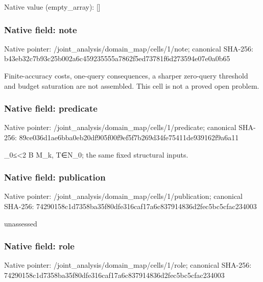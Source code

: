 \documentclass[10pt,a4paper]{article}
\begin{document}
Native value (empty\_\allowbreak{}array): []

\subsubsection{Native field: note}
Native pointer: /joint\_\allowbreak{}analysis/domain\_\allowbreak{}map/cells/1/note; canonical SHA-256: b43eb32c7b93c25b002a6c459235555a7862f5ed73781f6d273594e07e0a0b65

\begingroup\raggedright\sloppy Finite-accuracy costs,\allowbreak{} one-query consequences,\allowbreak{} a sharper zero-query threshold and budget saturation are not assembled. This cell is not a proved open problem.\par\endgroup

\subsubsection{Native field: predicate}
Native pointer: /joint\_\allowbreak{}analysis/domain\_\allowbreak{}map/cells/1/predicate; canonical SHA-256: 89ce036d1ae6bba0eb20df905f00f9ef5f7b269d34fe75411de939162f9a6a11

\begingroup\raggedright{}\allowbreak{}\_\allowbreak{}0{\AtlasUnicodeSymbols ≤}\allowbreak{}<2 B M\_\allowbreak{}k,\allowbreak{} T{\AtlasUnicodeSymbols ∈}\allowbreak{}N\_\allowbreak{}0;\allowbreak{} the same fixed structural inputs.\par\endgroup

\subsubsection{Native field: publication}
Native pointer: /joint\_\allowbreak{}analysis/domain\_\allowbreak{}map/cells/1/publication; canonical SHA-256: 74290158c1d7358ba35f80dfe316caf17a6c837914836d2fec5bc5cfac234003

\begingroup\raggedright\sloppy unassessed\par\endgroup

\subsubsection{Native field: role}
Native pointer: /joint\_\allowbreak{}analysis/domain\_\allowbreak{}map/cells/1/role; canonical SHA-256: 74290158c1d7358ba35f80dfe316caf17a6c837914836d2fec5bc5cfac234003
\end{document}
